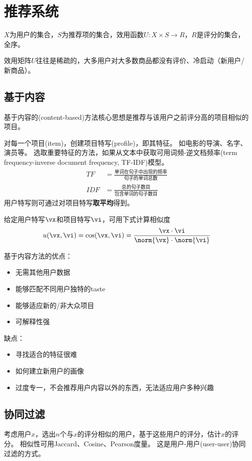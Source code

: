 
\section{推荐系统}
$X$为用户的集合，$S$为推荐项的集合，效用函数$U:X\times S\to R$，$R$是评分的集合，全序。

效用矩阵$U$往往是稀疏的，大多用户对大多数商品都没有评价、冷启动（新用户/新商品）。

\subsection{基于内容}
基于内容的(content-based)方法核心思想是推荐与该用户之前评分高的项目相似的项目。

对每一个项目(item)，创建项目特写(profile)，即其特征。
如电影的导演、名字、演员等。
选取重要特征的方法，如果从文本中获取可用词频-逆文档频率(term frequency-inverse document frequency, TF-IDF)模型。
\[\begin{aligned}
TF &= \frac{\text{单词在句子中出现的频率}}{\text{句子的单词总数}}\\
IDF &= \frac{\text{总的句子数目}}{\text{包含单词的句子数目}}
\end{aligned}\]
用户特写则可通过对项目特写\textbf{取平均}得到。

给定用户特写$\vx$和项目特写$\vi$，可用下式计算相似度
\[u(\vx,\vi)=\cos(\vx,\vi)=\frac{\vx\cdot\vi}{\norm{\vx}\cdot\norm{\vi}}\]

基于内容方法的优点：
\begin{itemize}
	\item 无需其他用户数据
	\item 能够匹配不同用户独特的taste
	\item 能够适应新的/非大众项目
	\item 可解释性强
\end{itemize}
缺点：
\begin{itemize}
	\item 寻找适合的特征很难
	\item 如何建立新用户的画像
	\item 过度专一，不会推荐用户内容以外的东西，无法适应用户多种兴趣
\end{itemize}

\subsection{协同过滤}
考虑用户$x，选出$$n$个与$x$的评分相似的用户，基于这些用户的评分，估计$x$的评分。
相似性可用Jaccard、Cosine、Pearson度量。
这是用户-用户(user-user)协同过滤的方式。


